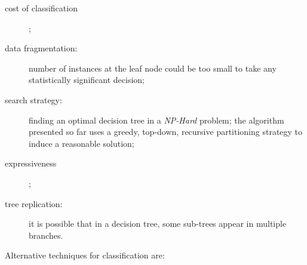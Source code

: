 \begin{description}
\begin{itemize}
	\end{itemize}
	\item[cost of classification];
	\item[data fragmentation:] number of instances at the leaf node could be too small to take any statistically significant decision;
	\item[search strategy:] finding an optimal decision tree in a \emph{NP-Hard} problem; the algorithm presented so far uses a greedy, top-down, recursive partitioning strategy to induce a reasonable solution;
	\item[expressiveness];
	\item[tree replication:] it is possible that in a decision tree, some sub-trees appear in multiple branches.
\end{description}

Alternative techniques for classification are:

